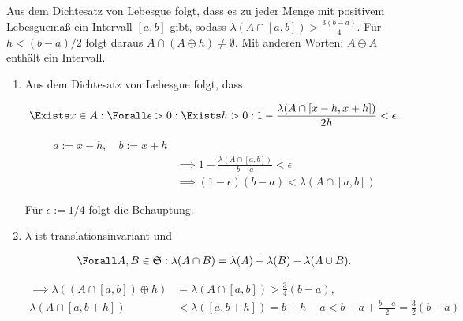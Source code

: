 
\begin{exercise}

Aus dem Dichtesatz von Lebesgue folgt, dass es zu jeder Menge mit positivem Lebesguemaß ein Intervall $[a, b]$ gibt, sodass $\lambda(A \cap [a, b]) > \frac{3 (b - a)}{4}$.
Für $h < (b - a) / 2$ folgt daraus $A \cap (A \oplus h) \neq \emptyset$.
Mit anderen Worten:
$A \ominus A$ enthält ein Intervall.

\end{exercise}


\begin{solution}

\phantom{}

\begin{enumerate}[label = (\arabic*)]

    \item Aus dem Dichtesatz von Lebesgue folgt, dass
    
    \begin{align*}
        \Exists x \in A:
            \Forall \epsilon > 0:
                \Exists h > 0:
                    1 - \frac{\lambda(A \cap [x - h, x + h])}{2 h} < \epsilon.
    \end{align*}

    \begin{align*}
        a := x - h, \quad b := x + h \\
        & \implies
        1 - \frac{\lambda(A \cap [a, b])}{b - a} < \epsilon \\
        & \implies
        (1 - \epsilon) (b - a) < \lambda(A \cap [a, b])
    \end{align*}

    Für $\epsilon := 1/4$ folgt die Behauptung.

    \item $\lambda$ ist translationsinvariant und

    \begin{align*}
        \Forall A, B \in \mathfrak S:
            \lambda(A \cap B) = \lambda(A) + \lambda(B) - \lambda(A \cup B).
    \end{align*}

    \begin{align*}
        \implies
        \lambda((A \cap [a, b]) \oplus h) & = \lambda(A \cap [a, b]) > \frac{3}{4} (b - a), \\
        \lambda(A \cap [a, b + h]) & < \lambda([a, b + h]) = b + h - a < b - a + \frac{b - a}{2} = \frac{3}{2} (b - a)
    \end{align*}


\end{enumerate}
\end{solution}
